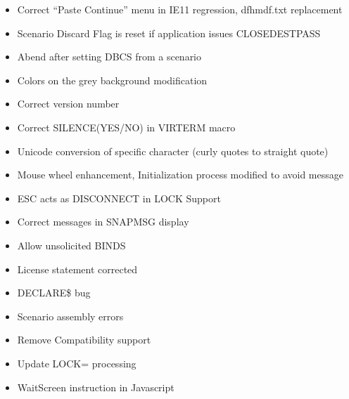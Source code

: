 \documentclass[letterpaper,10pt,english]{sphinxmanual}
\begin{document}
\begin{itemize}
\item {} 
 Correct “Paste Continue” menu in IE11 regression, dfhmdf.txt replacement

\item {} 
 Scenario Discard Flag is reset if application issues CLOSEDESTPASS

\item {} 
 Abend after setting DBCS from a scenario

\item {} 
 Colors on the grey background modification

\item {} 
 Correct version number

\item {} 
 Correct SILENCE(YES/NO) in VIRTERM macro

\item {} 
 Unicode conversion of specific character (curly quotes to straight quote)

\item {} 
 Mouse wheel enhancement, Initialization process modified to avoid message

\item {} 
 ESC acts as DISCONNECT in LOCK Support

\item {} 
 Correct messages in SNAPMSG display

\item {} 
 Allow unsolicited BINDS

\item {} 
 License statement corrected

\item {} 
 DECLARE\$ bug

\item {} 
 Scenario assembly errors

\item {} 
 Remove Compatibility support

\item {} 
 Update LOCK= processing

\item {} 
 WaitScreen instruction in Javascript


\end{itemize}
\end{document}
